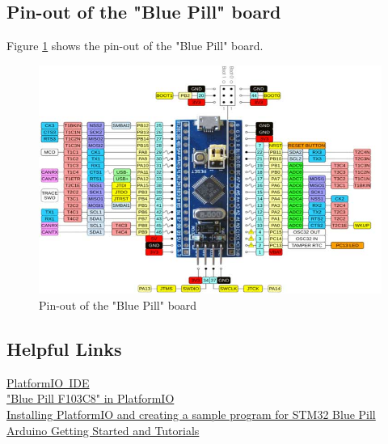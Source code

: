 \documentclass[11pt, oneside]{scrartcl}   	%
\begin{document}
\subsection{Pin-out of the "Blue Pill" board}
Figure \ref{fig:BluePillPinout} shows the pin-out of the "Blue Pill" board.
\begin{figure}[htbp]
	\centering
	\includegraphics[width=1.0\linewidth]{Figures/STM32-Blue-Pill-Development-Board-Pinout.jpg}
	\caption{Pin-out of the "Blue Pill" board}
	\label{fig:BluePillPinout}
\end{figure}

\subsection{Helpful Links}
\href{https://platformio.org/platformio-ide}{PlatformIO IDE}\\
\href{https://docs.platformio.org/en/latest//boards/ststm32/bluepill_f103c8.html}{"Blue Pill F103C8" in PlatformIO}\\
\href{https://www.youtube.com/watch?v=cmHQxd_qGl8}{Installing PlatformIO and creating a sample program for STM32 Blue Pill}\\
\href{https://www.arduino.cc/en/Tutorial/HomePage}{Arduino Getting Started and Tutorials}
\end{document}
